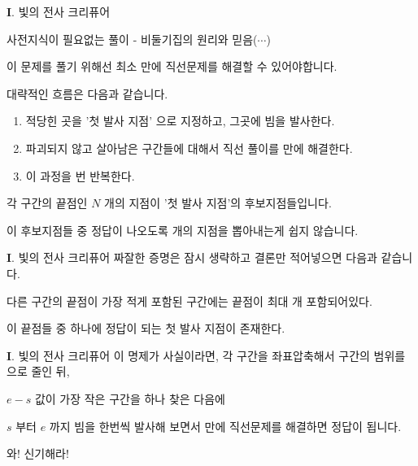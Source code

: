\begin{frame}{\textbf{I}. 빛의 전사 크리퓨어}
    \begin{block}{사전지식이 필요없는 풀이 - 비둘기집의 원리와 믿음($\cdots$)}\end{block}
    이 문제를 풀기 위해선 최소 만에 직선문제를 해결할 수 있어야합니다.

    대략적인 흐름은 다음과 같습니다.
    
    \vspace{18pt}
    
    \begin{enumerate}
        \item 적당힌 곳을 '첫 발사 지점' 으로 지정하고, 그곳에 빔을 발사한다.
        \item 파괴되지 않고 살아남은 구간들에 대해서 직선 풀이를 만에 해결한다.
        \item 이 과정을 번 반복한다.
    \end{enumerate}
    
    \vspace{18pt}
    
    각 구간의 끝점인 $N$ 개의 지점이 '첫 발사 지점'의 후보지점들입니다.
    
    이 후보지점들 중 정답이 나오도록 개의 지점을 뽑아내는게 쉽지 않습니다.
\end{frame}

\begin{frame}{\textbf{I}. 빛의 전사 크리퓨어}
    짜잘한 증명은 잠시 생략하고 결론만 적어넣으면 다음과 같습니다.
    
    \vspace{18pt}
    
    \begin{theorem}
        다른 구간의 끝점이 가장 적게 포함된 구간에는 끝점이 최대  개 포함되어있다.
        
        이 끝점들 중 하나에 정답이 되는 첫 발사 지점이 존재한다.
    \end{theorem}
\end{frame}

\begin{frame}{\textbf{I}. 빛의 전사 크리퓨어}
    이 명제가 사실이라면, 각 구간을 좌표압축해서 구간의 범위를 으로 줄인 뒤,
    
    $e-s$ 값이 가장 작은 구간을 하나 찾은 다음에
    
    $s$ 부터 $e$ 까지 빔을 한번씩 발사해 보면서  만에 직선문제를 해결하면 정답이 됩니다.
    
    \vspace{18pt}
    
    와! 신기해라!
\end{frame}

